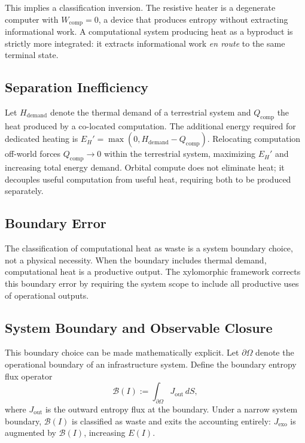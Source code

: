 \documentclass[10pt,twocolumn]{article}
\theoremstyle{plain}
\theoremstyle{definition}
\theoremstyle{remark}
\begin{document}
This implies a classification inversion. The resistive heater is a
degenerate computer with $W_{\mathrm{comp}} = 0$, a device that produces
entropy without extracting informational work. A computational system
producing heat as a byproduct is strictly more integrated: it extracts
informational work \emph{en route} to the same terminal state.

\subsection{Separation Inefficiency}

Let $H_{\mathrm{demand}}$ denote the thermal demand of a terrestrial
system and $Q_{\mathrm{comp}}$ the heat produced by a co-located
computation. The additional energy required for dedicated heating is
$E_H' = \max(0, H_{\mathrm{demand}} - Q_{\mathrm{comp}})$. Relocating
computation off-world forces $Q_{\mathrm{comp}} \to 0$ within the
terrestrial system, maximizing $E_H'$ and increasing total energy
demand. Orbital compute does not eliminate heat; it decouples useful
computation from useful heat, requiring both to be produced separately.

\subsection{Boundary Error}

The classification of computational heat as waste is a system boundary
choice, not a physical necessity. When the boundary includes thermal
demand, computational heat is a productive output. The xylomorphic
framework corrects this boundary error by requiring the system scope to
include all productive uses of operational outputs.

\subsection{System Boundary and Observable Closure}

This boundary choice can be made mathematically explicit. Let
$\partial\Omega$ denote the operational boundary of an infrastructure
system. Define the boundary entropy flux operator
\[
  \mathcal{B}(I) := \int_{\partial\Omega} J_{\mathrm{out}}\,dS,
\]
where $J_{\mathrm{out}}$ is the outward entropy flux at the boundary.
Under a narrow system boundary, $\mathcal{B}(I)$ is classified as
waste and exits the accounting entirely: $J_{\mathrm{exo}}$ is
augmented by $\mathcal{B}(I)$, increasing $E(I)$.
\end{document}
